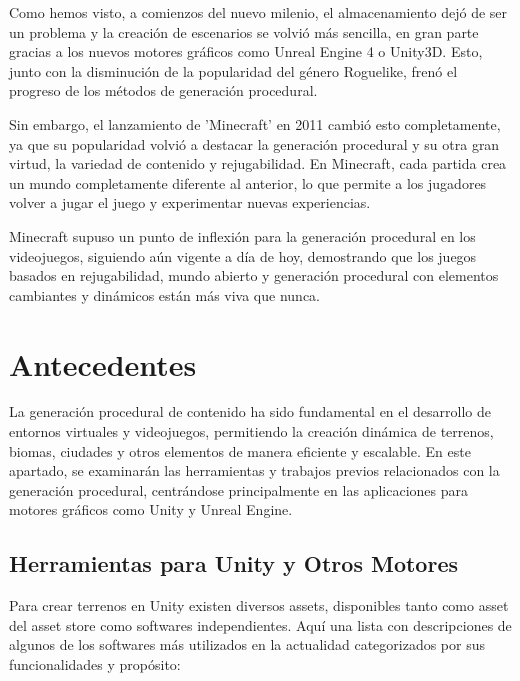     Como hemos visto, a comienzos del nuevo milenio, el almacenamiento dejó de ser un problema y la creación de escenarios se volvió más sencilla, en gran parte gracias a los nuevos motores gráficos como Unreal Engine 4 o Unity3D. Esto, junto con la disminución de la popularidad del género Roguelike, frenó el progreso de los métodos de generación procedural.

    Sin embargo, el lanzamiento de 'Minecraft' en 2011 cambió esto completamente, ya que su popularidad volvió a destacar la generación procedural y su otra gran virtud, la variedad de contenido y rejugabilidad. En Minecraft, cada partida crea un mundo completamente diferente al anterior, lo que permite a los jugadores volver a jugar el juego y experimentar nuevas experiencias.
    
    Minecraft supuso un punto de inflexión para la generación procedural en los videojuegos, siguiendo aún vigente a día de hoy, demostrando que los juegos basados en rejugabilidad, mundo abierto y generación procedural con elementos cambiantes y dinámicos están más viva que nunca.

\section{Antecedentes}

    La generación procedural de contenido ha sido fundamental en el desarrollo de entornos virtuales y videojuegos, permitiendo la creación dinámica de terrenos, biomas, ciudades y otros elementos de manera eficiente y escalable. En este apartado, se examinarán las herramientas y trabajos previos relacionados con la generación procedural, centrándose principalmente en las aplicaciones para motores gráficos como Unity y Unreal Engine.

    \subsection{Herramientas para Unity y Otros Motores}

    Para crear terrenos en Unity existen diversos assets, disponibles tanto como asset del asset store como softwares independientes. Aquí una lista con descripciones de algunos de los softwares más utilizados en la actualidad categorizados por sus funcionalidades y propósito:

